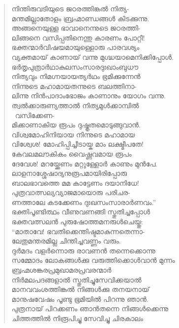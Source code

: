 \begin{verse}
നിന്തിരുവടിയുടെ ജഠരത്തിങ്കല്‍ നിത്യ-\\
മന്തമില്ലാതോളം ബ്രഹ്മാണ്ഡങ്ങള്‍ കിടക്കുന്നു.\\
അങ്ങനെയുള്ള ഭാവാനെന്നുടെ ജഠരത്തി-\\
ലിങ്ങനെ വസിപ്പതിനെന്തു കാരണം പോറ്റീ!\\
ഭക്തന്മാര്‍വിഷയമായുള്ളൊരു പാരവശ്യം\\
വ്യക്തമായ് കാണായ് വന്നു മുഗ്ദ്ധയാമെനിക്കിപ്പോള്‍.\\
ഭര്‍തൃപുത്രാര്‍ഥാകുലസംസാരദുഃഖാംബുധൗ\\
നിത്യവും നിമഗ്നയായത്യര്‍ഥം ഭ്രമിക്കുന്നേന്‍\\
നിന്നുടെ മഹാമായതന്നുടെ ബലത്തിനാ-\\
ലിന്നു നിന്‍പാദാംഭോജം കാണാനും യോഗം വന്നു.\\
ത്വല്‍ക്കാരുണ്യത്താല്‍ നിത്യമുള്‍ക്കാമ്പില്‍\\ ~\hfill വസിക്കേണ-\\
മിക്കാണാകിയ രൂപം ദുഷ്കൃതമൊടുങ്ങുവാന്‍.\\
വിശ്വമോഹിനിയായ നിന്നുടെ മഹാമായ\\
വിശ്വേശ! മോഹിപ്പിച്ചീടായ്ക മാം ലക്ഷ്മീപതേ!\\
കേവലമലൗകികം വൈഷ്ണവമായ രൂപം\\
ദേവേശ! മറയ്ക്കേണം മറ്റുള്ളോര്‍ കാണും മുന്‍പേ.\\
ലാളനാശ്ശേഷാദ്യനുരൂപമായിരിപ്പോരു\\
ബാലഭാവത്തെ മമ കാട്ടേണം ദയാനിധേ!\\
പുത്രവാത്സല്യവ്യാജമായൊരു പരിചര-\\
ണത്താലേ കടക്കേണം ദുഃഖസംസാരാര്‍ണവം.”\\
ഭക്തിപൂണ്ടിത്ഥം വീണുവണങ്ങി സ്തുതിച്ചപ്പോള്‍\\
ഭക്തവത്സലന്‍ പുരുഷോത്തമനരുള്‍ചെയ്തു:\\
“മാതാവേ! ഭവതിക്കെന്തിഷ്ടമാകുന്നതെന്നാ-\\
ലേതുമന്തരമില്ല ചിന്തിച്ചവണ്ണം വരും.\\
ദുര്‍മദം വളര്‍ന്നൊരു രാവണന്‍ തന്നെക്കൊന്നു\\
സമ്മോദം ലോകങ്ങള്‍ക്കു വരുത്തിക്കൊള്‍വാന്‍ \hbox{മുന്നം}\\
ബ്രഹ്മശങ്കരപ്രമുഖാമരപ്രവരന്മാര്‍\\
നിര്‍മലപദങ്ങളാല്‍ സ്തുതിച്ചുസേവിക്കയാല്‍\\
മാനവവംശത്തിങ്കല്‍ നിങ്ങള്‍ക്കു തനയനായ്\\
മാനുഷവേഷം പൂണ്ടു ഭൂമിയില്‍ പിറന്നു ഞാന്‍.\\
പുത്രനായ് പിറക്കണം ഞാന്‍തന്നെ നിങ്ങള്‍ക്കെന്നു\\
ചിത്തത്തില്‍ നിരൂപിച്ചു സേവിച്ചു ചിരകാലം\\

\end{verse}
